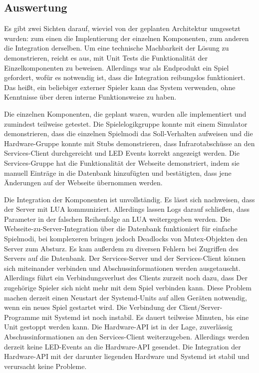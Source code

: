 \subsection{Auswertung}

Es gibt zwei Sichten darauf, wieviel von der geplanten Architektur umgesetzt wurden: zum einen die
Implentierung der einzelnen Komponenten, zum anderen die Integration derselben.
Um eine technische Machbarkeit der Lösung zu demonstrieren, reicht es aus, mit Unit Tests die
Funktionalität der Einzelkomponenten zu beweisen.
Allerdings war als Endprodukt ein Spiel gefordert, wofür es notwendig ist, dass die Integration
reibungslos funktioniert.
Das heißt, ein beliebiger externer Spieler kann das System verwenden, ohne Kenntnisse über deren
interne Funktionsweise zu haben.

Die einzelnen Komponenten, die geplant waren, wurden alle implementiert und zumindest teilweise
getestet.
Die Spielelogikgruppe konnte mit einem Simulator demonstrieren, dass die einzelnen Spielmodi das
Soll-Verhalten aufweisen und die Hardware-Gruppe konnte mit Stubs demonstrieren, dass
Infrarotabschüsse an den Services-Client durchgereicht und LED Events korrekt angezeigt werden.
Die Services-Gruppe hat die Funktionalität der Webseite demonstriert, indem sie manuell Einträge in
die Datenbank hinzufügten und bestätigten, dass jene Änderungen auf der Webseite übernommen werden.

Die Integration der Komponenten ist unvollständig.
Es lässt sich nachweisen, dass der Server mit LUA kommuniziert.
Allerdings lassen Logs darauf schließen, dass Parameter in der falschen Reihenfolge an LUA
weitergegeben werden.
Die Webseite-zu-Server-Integration über die Datenbank funktioniert für einfache Spielmodi, bei
komplexeren bringen jedoch Deadlocks von Mutex-Objekten den Server zum Absturz.
Es kam außerdem zu diversen Fehlern bei Zugriffen des Servers auf die Datenbank.
Der Services-Server und der Services-Client können sich miteinander verbinden und
Abschussinformationen werden ausgetauscht.
Allerdings führt ein Verbindungsverlust des Clients zurzeit noch dazu, dass Der zugehörige Spieler sich 
nicht mehr mit dem Spiel verbinden kann.
Diese Problem machen derzeit einen Neustart der Systemd-Units auf allen Geräten notwendig, wenn ein
neues Spiel gestartet wird.
Die Verbindung der Client/Server-Programme mit Systemd ist noch instabil.
Es dauert teilweise Minuten, bis eine Unit gestoppt werden kann.
Die Hardware-API ist in der Lage, zuverlässig Abschussinformationen an den Services-Client
weiterzugeben.
Allerdings werden derzeit keine LED-Events an die Hardware-API gesendet.
Die Integration der Hardware-API mit der darunter liegenden Hardware und Systemd ist stabil und
verursacht keine Probleme.
